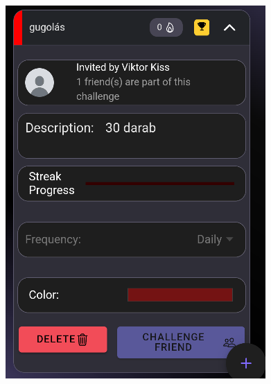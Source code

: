 \documentclass[12pt]{report}
\begin{document}
\begin{figure}[H]
    \centering

    \begin{minipage}[b]{0.3\textwidth}
        \includegraphics[width=\linewidth]{src/challenge6.png}
    \end{minipage}
    \hfill
    \begin{minipage}[b]{0.3\textwidth}

\end{minipage}
\end{figure}
\end{document}
